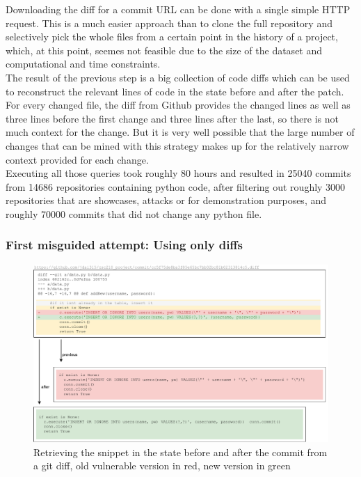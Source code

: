 \documentclass[
a4paper,
pagesize,
pdftex,
12pt,
twoside, %
BCOR=5mm, %
ngerman,
fleqn,
final,
]{scrartcl}
\begin{document}
	Downloading the diff for a commit URL can be done with a single simple HTTP request. This is a much easier approach than to clone the full repository and selectively pick the whole files from a certain point in the history of a project, which, at this point, seemes not feasible due to the size of the dataset and computational and time constraints. \\
	The result of the previous step is a big collection of code diffs which can be used to reconstruct the relevant lines of code in the state before and after the patch. For every changed file, the diff from Github provides the changed lines as well as three lines before the first change and three lines after the last, so there is not much context for the change. 
	But it is very well possible that the large number of changes that can be mined with this strategy makes up for the relatively narrow context provided for each change.\\
	Executing all those queries took roughly 80 hours and resulted in 25040 commits from 14686 repositories containing python code, after filtering out roughly 3000 repositories that are showcases, attacks or for demonstration purposes, and roughly 70000 commits that did not change any python file.	
	
	\subsubsection{First misguided attempt: Using only diffs}
	
	\begin{figure}[ht]
		\centering
		\includegraphics[width=\linewidth]{img/GitCommitPreviousAfter}
		\caption{Retrieving the snippet in the state before and after the commit from a git diff, old vulnerable version in red, new version in green}
		\label{fig:gitdiff}
	\end{figure}
	
\end{document}
